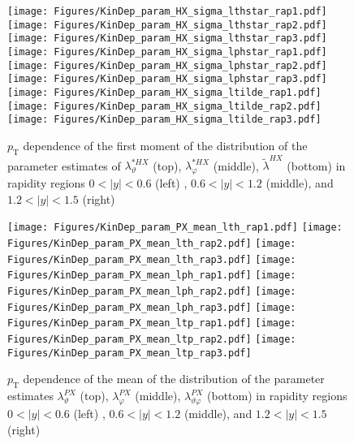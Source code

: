 \documentclass[12pt]{article}
\newcommand{\pT}{p_\mathrm{T}}
\newcommand{\absy}{\left |  y \right |}
\newcommand{\lamtildeHX}{\tilde{\lambda}^{\scriptscriptstyle HX}}
\newcommand{\lamthstarHX}{\lambda^{* \scriptscriptstyle HX}_\vartheta}
\newcommand{\lamphstarHX}{\lambda^{* \scriptscriptstyle HX}_\varphi}
\newcommand{\lamthPX}{\lambda^{\scriptscriptstyle PX}_\vartheta}
\newcommand{\lamphPX}{\lambda^{\scriptscriptstyle PX}_\varphi}
\newcommand{\lamthphPX}{\lambda^{\scriptscriptstyle PX}_{\vartheta \varphi}}
\begin{document}
\begin{figure}[htbp]
\centering
\texttt{[image: Figures/KinDep\_param\_HX\_sigma\_lthstar\_rap1.pdf]}
\texttt{[image: Figures/KinDep\_param\_HX\_sigma\_lthstar\_rap2.pdf]}
\texttt{[image: Figures/KinDep\_param\_HX\_sigma\_lthstar\_rap3.pdf]}
\texttt{[image: Figures/KinDep\_param\_HX\_sigma\_lphstar\_rap1.pdf]}
\texttt{[image: Figures/KinDep\_param\_HX\_sigma\_lphstar\_rap2.pdf]}
\texttt{[image: Figures/KinDep\_param\_HX\_sigma\_lphstar\_rap3.pdf]}
\texttt{[image: Figures/KinDep\_param\_HX\_sigma\_ltilde\_rap1.pdf]}
\texttt{[image: Figures/KinDep\_param\_HX\_sigma\_ltilde\_rap2.pdf]}
\texttt{[image: Figures/KinDep\_param\_HX\_sigma\_ltilde\_rap3.pdf]}
\caption{$\pT$ dependence of the first moment of the distribution of the parameter estimates of $\lamthstarHX$ (top), $\lamphstarHX$ (middle), $\lamtildeHX$ (bottom) in rapidity regions $0<\absy<0.6$ (left) , $0.6<\absy<1.2$ (middle), and $1.2<\absy<1.5$ (right)}
\end{figure}
\clearpage








\begin{figure}[htbp]
\centering
\texttt{[image: Figures/KinDep\_param\_PX\_mean\_lth\_rap1.pdf]}
\texttt{[image: Figures/KinDep\_param\_PX\_mean\_lth\_rap2.pdf]}
\texttt{[image: Figures/KinDep\_param\_PX\_mean\_lth\_rap3.pdf]}
\texttt{[image: Figures/KinDep\_param\_PX\_mean\_lph\_rap1.pdf]}
\texttt{[image: Figures/KinDep\_param\_PX\_mean\_lph\_rap2.pdf]}
\texttt{[image: Figures/KinDep\_param\_PX\_mean\_lph\_rap3.pdf]}
\texttt{[image: Figures/KinDep\_param\_PX\_mean\_ltp\_rap1.pdf]}
\texttt{[image: Figures/KinDep\_param\_PX\_mean\_ltp\_rap2.pdf]}
\texttt{[image: Figures/KinDep\_param\_PX\_mean\_ltp\_rap3.pdf]}
\caption{$\pT$ dependence of the mean of the distribution of the parameter estimates $\lamthPX$ (top), $\lamphPX$ (middle), $\lamthphPX$ (bottom) in rapidity regions $0<\absy<0.6$ (left) , $0.6<\absy<1.2$ (middle), and $1.2<\absy<1.5$ (right)}
\end{figure}
\clearpage
\end{document}
